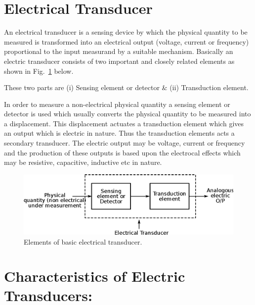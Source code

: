 \section{Electrical Transducer}\label{sec9.2}
An electrical transducer is a sensing device by which the physical
quantity to be measured  is transformed into an electrical output
(voltage, current or frequency) proportional to the input measurand
by a suitable mechanism.  Basically an electric transducer consists of
two important and closely related elements as shown in
Fig.~\ref{fig9.1} below.

These two parts are (i) Sensing element or detector \& (ii)
Transduction element.

In order to measure a non-electrical physical quantity a sensing
element or detector is used which usually converts the physical
quantity to be measured  into a displacement. This displacement
actuates  a transduction element which gives an output which is
electric in nature. Thus the transduction elements acts a secondary
transducer. The electric output may be voltage, current or frequency
and the production of these outputs is based upon  the electrocal
effects which may be resistive, capacitive, inductive etc in nature.
\begin{figure}[H]
\centering
\includegraphics{chap9/fig9.1.eps}
\caption{Elements of basic electrical transducer.}\label{fig9.1}
\end{figure}

\section{Characteristics of Electric Transducers:}\label{sec9.3}

